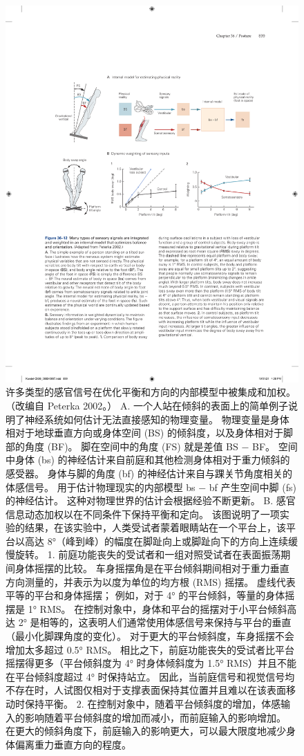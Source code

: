 \begin{figure}[htbp]
	\centering
	\includegraphics[width=0.85\linewidth]{chap36/fig_36_12}
	\caption{许多类型的感官信号在优化平衡和方向的内部模型中被集成和加权。 （改编自 Peterka 2002。） A. 一个人站在倾斜的表面上的简单例子说明了神经系统如何估计无法直接感知的物理变量。 物理变量是身体相对于地球垂直方向或身体空间 (BS) 的倾斜度，以及身体相对于脚部的角度 (BF)。 脚在空间中的角度 (FS) 就是差值 BS − BF。 空间中身体 (bs) 的神经估计来自前庭和其他检测身体相对于重力倾斜的感受器。 身体与脚的角度 (bf) 的神经估计来自与踝关节角度相关的体感信号。 用于估计物理现实的内部模型 bs − bf 产生空间中脚 (fs) 的神经估计。 这种对物理世界的估计会根据经验不断更新。 B. 感官信息动态加权以在不同条件下保持平衡和定向。 该图说明了一项实验的结果，在该实验中，人类受试者蒙着眼睛站在一个平台上，该平台以高达 8°（峰到峰）的幅度在脚趾向上或脚趾向下的方向上连续缓慢旋转。 1. 前庭功能丧失的受试者和一组对照受试者在表面振荡期间身体摇摆的比较。 车身摇摆角是在平台倾斜期间相对于重力垂直方向测量的，并表示为以度为单位的均方根 (RMS) 摇摆。 虚线代表平等的平台和身体摇摆； 例如，对于 4° 的平台倾斜，等量的身体摇摆是 1° RMS。 在控制对象中，身体和平台的摇摆对于小平台倾斜高达 2° 是相等的，这表明人们通常使用体感信号来保持与平台的垂直（最小化脚踝角度的变化）。 对于更大的平台倾斜度，车身摇摆不会增加太多超过 0.5° RMS。 相比之下，前庭功能丧失的受试者比平台摇摆得更多（平台倾斜度为 4° 时身体倾斜度为 1.5° RMS）并且不能在平台倾斜度超过 4° 时保持站立。 因此，当前庭信号和视觉信号均不存在时，人试图仅相对于支撑表面保持其位置并且难以在该表面移动时保持平衡。 2. 在控制对象中，随着平台倾斜度的增加，体感输入的影响随着平台倾斜度的增加而减小，而前庭输入的影响增加。 在更大的倾斜角度下，前庭输入的影响更大，可以最大限度地减少身体偏离重力垂直方向的程度。}
	\label{fig:36_12}
\end{figure}

